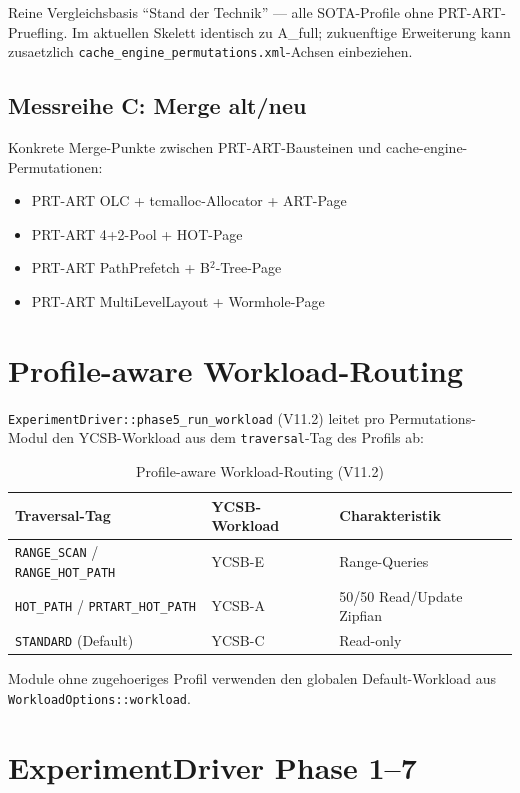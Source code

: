 Reine Vergleichsbasis ``Stand der Technik'' --- alle SOTA-Profile ohne
PRT-ART-Pruefling. Im aktuellen Skelett identisch zu A\_full;
zukuenftige Erweiterung kann zusaetzlich
\texttt{cache\_engine\_permutations.xml}-Achsen einbeziehen.

\subsection{Messreihe C: Merge alt/neu}

Konkrete Merge-Punkte zwischen PRT-ART-Bausteinen und cache-engine-
Permutationen:

\begin{itemize}
    \item PRT-ART OLC + tcmalloc-Allocator + ART-Page
    \item PRT-ART 4+2-Pool + HOT-Page
    \item PRT-ART PathPrefetch + B$^2$-Tree-Page
    \item PRT-ART MultiLevelLayout + Wormhole-Page
\end{itemize}

\section{Profile-aware Workload-Routing}

\texttt{ExperimentDriver::phase5\_run\_workload} (V11.2) leitet pro
Permutations-Modul den YCSB-Workload aus dem \texttt{traversal}-Tag
des Profils ab:

\begin{table}[h]
\centering
\begin{tabular}{lll}
\toprule
\textbf{Traversal-Tag} & \textbf{YCSB-Workload} & \textbf{Charakteristik} \\
\midrule
\texttt{RANGE\_SCAN} / \texttt{RANGE\_HOT\_PATH} & YCSB-E & Range-Queries \\
\texttt{HOT\_PATH} / \texttt{PRTART\_HOT\_PATH} & YCSB-A & 50/50 Read/Update Zipfian \\
\texttt{STANDARD} (Default) & YCSB-C & Read-only \\
\bottomrule
\end{tabular}
\caption{Profile-aware Workload-Routing (V11.2)}
\label{tab:workload-routing}
\end{table}

Module ohne zugehoeriges Profil verwenden den globalen Default-Workload
aus \texttt{WorkloadOptions::workload}.

\section{ExperimentDriver Phase 1--7}

